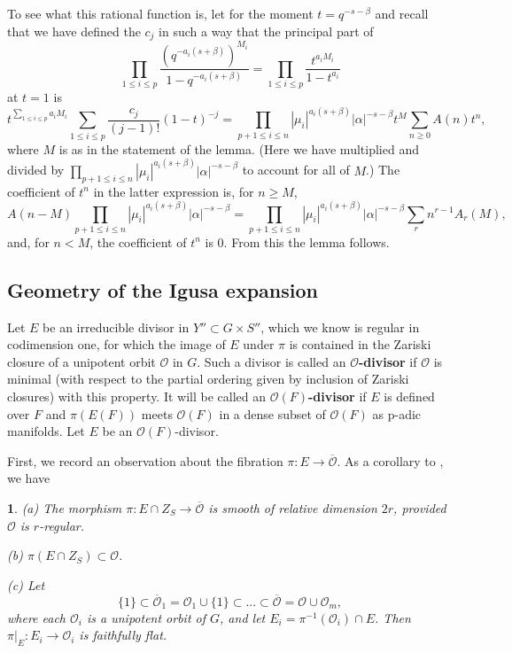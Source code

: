 \documentclass[12pt,letterpaper]{amsart}
\newcommand{\ooo}{\mathcal{O}}
\newcommand{\proclaimname}{}
\newtheorem*{proclaimx}{\proclaimname}
\newenvironment{proclaim}[1]%
  {\renewcommand{\proclaimname}{#1}\begin{proclaimx}}{\end{proclaimx}}
\begin{document}
To see what this rational function is, let for the moment
$t=q^{-s-\beta}$ and recall that we have defined the $c_j$ in
such a way that the principal part of
\[
\prod_{1\leq i\leq p}
\frac{(q^{-a_i(s+\beta)})^{M_i}}{1-q^{-a_i(s+\beta)}}=
\prod_{1\leq i\leq p}
\frac{t^{a_iM_i}}{1-t^{a_i}}
\]
at $t=1$ is
\[
t^{\sum_{1\leq i\leq p}a_iM_i}
\sum_{1\leq i\leq p}\frac{c_j}{(j-1)!}(1-t)^{-j}
=\prod_{p+1\leq i\leq n}|\mu_i|^{a_i(s+\beta)}|\alpha|^{-s-\beta}
t^M\sum_{n\geq 0}A(n)t^{n},
\]
where $M$ is as in the statement of the lemma.
(Here we have multiplied and divided by
$\prod_{p+1\leq i\leq n}|\mu_i|^{a_i(s+\beta)}\allowbreak
|\alpha|^{-s-\beta}$ to account for all of $M$.)
The coefficient of $t^n$ in the latter expression is,
for $n\geq M$,
\[
A(n-M)\prod_{p+1\leq i\leq n}|\mu_i|^{a_i(s+\beta)}|\alpha|^{-s-\beta}
=\prod_{p+1\leq i\leq n}|\mu_i|^{a_i(s+\beta)}|\alpha|^{-s-\beta}
\sum_rn^{r-1}A_r(M),
\]
and, for $n<M$, the coefficient of $t^n$ is $0$. From this the
lemma follows.

\subsection*{Geometry of the Igusa expansion}

Let $E$ be an irreducible divisor in $Y''\subset G\times S''$,
which we know is regular in
codimension one, for which the image of $E$ under $\pi$ is contained in the
Zariski closure of a unipotent orbit ${\mathcal O}$ in $G$. Such a divisor is
called an \textbf{${\mathcal O}$-divisor} if ${\mathcal O}$ is minimal (with respect to
the partial ordering given by inclusion of Zariski closures) with this
property. It will be called an \textbf{${\mathcal O}(F)$-divisor} if $E$
is defined over $F$ and
$\pi(E(F))$ meets ${\mathcal O}(F)$ in a dense subset of $\ooo(F)$
as p-adic manifolds.
Let $E$ be an ${\mathcal O}(F)$-divisor.

First, we record an observation about
the fibration $\pi:E\rightarrow \overline{\ooo}$.
As a corollary to \cite[ch II, Prop. 3.1]{DG80}, we have

\begin{proclaim}{Lemma 5.10}
(a) The morphism $\pi:E\cap Z_S \rightarrow \overline{\ooo}$ is
smooth of relative
dimension $2r$, provided $\ooo$ is $r$-regular.

(b) $\pi(E\cap Z_S)\subset \ooo$.

(c) Let
\[
\{1\}\subset \overline{\mathcal O}_1={\mathcal O}_1\cup \{1\}
\subset ...\subset \overline{\mathcal O}={\mathcal O}\cup {\mathcal O}_m,
\]
where each ${\mathcal O}_i$ is a unipotent orbit of $G$,
and let $E_i=\pi^{-1}({\mathcal O}_i)\cap E$. Then $\pi|_{E}:E_i
\rightarrow {\mathcal O}_i$ is faithfully flat.
\end{proclaim}
\end{document}
